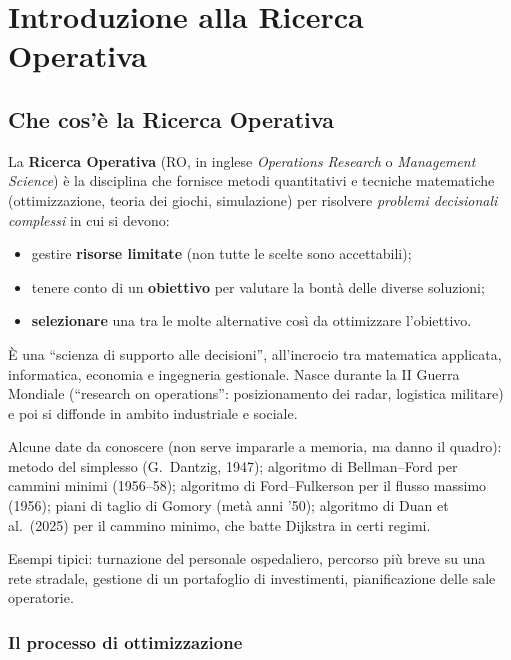 \chapter{Introduzione alla Ricerca Operativa}

\section{Che cos'è la Ricerca Operativa}

La \textbf{Ricerca Operativa} (RO, in inglese \emph{Operations Research} o \emph{Management Science}) è la disciplina che fornisce metodi quantitativi e tecniche matematiche (ottimizzazione, teoria dei giochi, simulazione) per risolvere \emph{problemi decisionali complessi} in cui si devono:
\begin{itemize}[nosep]
  \item gestire \textbf{risorse limitate} (non tutte le scelte sono accettabili);
  \item tenere conto di un \textbf{obiettivo} per valutare la bontà delle diverse soluzioni;
  \item \textbf{selezionare} una tra le molte alternative così da ottimizzare l'obiettivo.
\end{itemize}
È una ``scienza di supporto alle decisioni'', all'incrocio tra matematica applicata, informatica, economia e ingegneria gestionale. Nasce durante la II Guerra Mondiale (``research on operations'': posizionamento dei radar, logistica militare) e poi si diffonde in ambito industriale e sociale.

Alcune date da conoscere (non serve impararle a memoria, ma danno il quadro): metodo del simplesso (G.\ Dantzig, 1947); algoritmo di Bellman--Ford per cammini minimi (1956--58); algoritmo di Ford--Fulkerson per il flusso massimo (1956); piani di taglio di Gomory (metà anni '50); algoritmo di Duan et al.\ (2025) per il cammino minimo, che batte Dijkstra in certi regimi.

Esempi tipici: turnazione del personale ospedaliero, percorso più breve su una rete stradale, gestione di un portafoglio di investimenti, pianificazione delle sale operatorie.

\subsection{Il processo di ottimizzazione}

